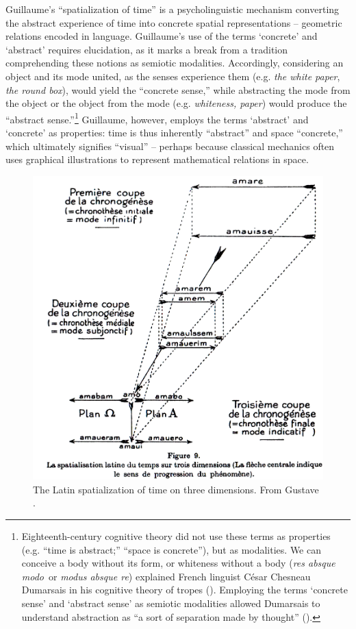 \documentclass[output=paper]{langsci/langscibook}
\begin{document}
Guillaume’s “spatialization of time” is a psycholinguistic mechanism converting the abstract experience of time into concrete spatial representations -- geometric relations encoded in language. Guillaume’s use of the terms ‘concrete’ and ‘abstract’ requires elucidation, as it marks a break from a tradition comprehending these notions as semiotic modalities. Accordingly, considering an object and its mode united, as the senses experience them (e.g. \textit{the white paper}, \textit{the round box}), would yield the “concrete sense,” while abstracting the mode from the object or the object from the mode (e.g. \textit{whiteness, paper}) would produce the “abstract sense.”\footnote{Eighteenth-century cognitive theory did not use these terms as properties (e.g. “time is abstract;” “space is concrete”), but as modalities. We can conceive a body without its form, or whiteness without a body (\textit{res absque modo}~or \textit{modus absque re}) explained French linguist César Chesneau Dumarsais in his cognitive theory of tropes (\citeyear{dumarsais_tropes_1730}). Employing the terms ‘concrete sense’ and ‘abstract sense’ as semiotic modalities allowed Dumarsais to understand abstraction as “a sort of separation made by thought” (\citeyear[260]{dumarsais_tropes_1730}).} Guillaume, however, employs the terms ‘abstract’ and ‘concrete’ as properties: time is thus inherently “abstract” and space “concrete,” which ultimately signifies “visual” -- perhaps because classical mechanics often uses graphical illustrations to represent mathematical relations in space.

\begin{figure}
\includegraphics[width=.75\textwidth]{figures/03/Ch3Fig1.png}
\caption{The Latin spatialization of time on three dimensions. From Gustave \citet[37]{guillaume_larchitectonique_1965}.\label{fig:3:1}}
\end{figure}
\end{document}
